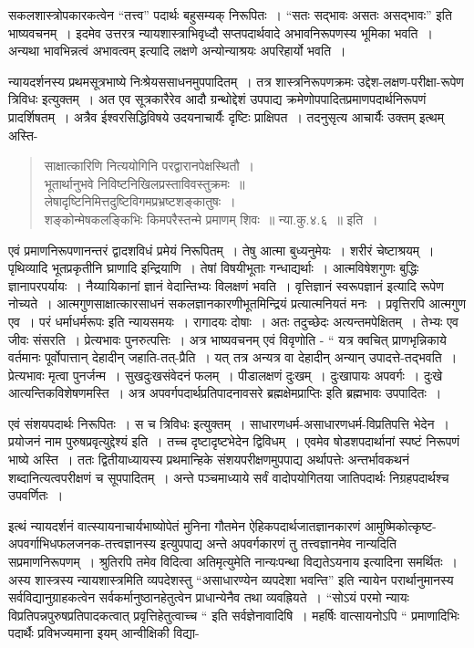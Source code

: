 {सकलशास्त्रोपकारकत्वेन “तत्त्व” पदार्थः बहुसम्यक् निरूपितः~। “सतः सद्भावः असतः असद्भावः” इति भाष्यवचनम्~। इदमेव उत्तरत्र न्यायशास्त्राभिवृध्दौ सप्तपदार्थवादे अभावनिरूपणस्य भूमिका भवति~। अन्यथा भावभिन्नत्वं अभावत्वम् इत्यादि लक्षणे अन्योन्याश्रयः अपरिहार्यो भवति~। 

न्यायदर्शनस्य प्रथमसूत्रभाष्ये निःश्रेयससाधनमुपपादितम्~। तत्र शास्त्रनिरूपणक्रमः उद्देश-लक्षण-परीक्षा-रूपेण त्रिविधः इत्युक्तम्~। अत एव सूत्रकारैरेव आदौ ग्रन्थोद्देशं उपपाद्य क्रमेणोपपादितप्रमाणपदार्थनिरूपणं प्रादर्शिषतम्~। अत्रैव ईश्वरसिद्धिविषये उदयनाचार्यैः दृष्टिः प्राक्षिपत~। तदनुसृत्य आचार्यैः उक्तम् इत्थम् अस्ति-

\begin{verse}
साक्षात्कारिणि नित्ययोगिनि परद्वारानपेक्षस्थितौ~। \\
भूतार्थानुभवे निविष्टनिखिलप्रस्ताविवस्तुक्रमः~॥\\
लेषादृष्टिनिमित्तदुष्टिविगमप्रभ्रष्टशङ्कातुषः~। \\
शङ्कोन्मेषकलङ्किभिः किमपरैस्तन्मे प्रमाणम् शिवः~॥ न्या.कु.४.६~॥ इति~। 
\end{verse}

एवं प्रमाणनिरूपणानन्तरं द्वादशविधं प्रमेयं निरूपितम्~। तेषु आत्मा बुध्यनुमेयः~। शरीरं चेष्टाश्रयम्~। पृथिव्यादि भूतप्रकृतीनि घ्राणादि इन्द्रियाणि~। तेषां विषयीभूताः गन्धाद्यर्थाः~। आत्मविषेशगुणः बुद्धिः ज्ञानापरपर्यायः~। नैय्यायिकानां ज्ञानं वेदान्तिभ्यः विलक्षणं भवति~। वृत्तिज्ञानं स्वरूपज्ञानं इत्यादि रूपेण नोच्यते~। आत्मगुणसाक्षात्कारसाधनं सकलज्ञानकारणीभूतमिन्द्रियं प्रत्यात्मनियतं मनः~। प्रवृत्तिरपि आत्मगुण एव~। परं धर्माधर्मरूपः इति न्यायसमयः~। रागादयः दोषाः~। अतः तदुच्छेदः अत्यन्तमपेक्षितम्~। तेभ्यः एव जीवः संसरति~। प्रेत्यभावः पुनरुत्पत्तिः~। अत्र भाष्यवचनम् एवं विवृणोति - “ यत्र क्वचित् प्राणभृन्निकाये वर्तमानः पूर्वोपात्तान् देहादीन् जहाति-तत्-प्रैति~। यत् तत्र अन्यत्र वा देहादीन् अन्यान् उपादत्ते-तद्भवति~। प्रेत्यभावः मृत्वा पुनर्जन्म~। सुखदुःखसंवेदनं फलम्~। पीडालक्षणं दुःखम्~। दुःखापायः अपवर्गः~। दुःखे आत्यन्तिकविशेषणमस्ति~। अत्र अपवर्गपदार्थप्रतिपादनावसरे ब्रह्मक्षेमप्राप्तिः इति ब्रह्मभावः उपपादितः~। 

एवं संशयपदार्थः निरूपितः~। स च त्रिविधः इत्युक्तम्~। साधारणधर्म-असाधारणधर्म-विप्रतिपत्ति भेदेन~। प्रयोजनं नाम पुरुषप्रवृत्युद्देश्यं इति~। तच्च दृष्टादृष्टभेदेन द्विविधम्~। एवमेव षोडशपदार्थानां स्पष्टं निरूपणं भाष्ये अस्ति~। ततः द्वितीयाध्यायस्य प्रथमान्हिके संशयपरीक्षणमुपपाद्य अर्थापत्तेः अन्तर्भावकथनं शब्दानित्यत्वपरीक्षणं च सूपपादितम्~। अन्ते पञ्चमाध्याये सर्वं वादोपयोगितया जातिपदार्थः निग्रहपदार्थश्च उपवर्णितः~। 

इत्थं न्यायदर्शनं वात्स्यायनाचार्यभाष्योपेतं मुनिना गौतमेन ऐहिकपदार्थजातज्ञानकारणं आमुष्मिकोत्कृष्ट-अपवर्गाभिध\-फलजनक-तत्त्वज्ञानस्य इत्युपपाद्य अन्ते अपवर्गकारणं तु तत्त्वज्ञानमेव नान्यदिति सप्रमाणनिरूपणम्~। श्रुतिरपि तमेव विदित्वा अतिमृत्युमेति नान्यःपन्था विद्यतेऽयनाय इत्यादिना समर्थितः~।  अस्य शास्त्रस्य न्यायशास्त्रमिति व्यपदेशस्तु “असाधारण्येन व्यपदेशा भवन्ति” इति न्यायेन परार्थानुमानस्य सर्वविद्यानुग्राहकत्वेन सर्वकर्मानुष्ठानहेतुत्वेन प्राधान्येनैव तथा व्यवह्रियते~। “सोऽयं परमो न्यायः विप्रतिपन्नपुरुषप्रतिपादकत्वात् प्रवृत्तिहेतुत्वाच्च “ इति सर्वज्ञेनावादिषि~। महर्षिः वात्सायनोऽपि “ प्रमाणादिभिः पदार्थैः प्रविभज्यमाना इयम् आन्वीक्षिकी विद्या-

}
